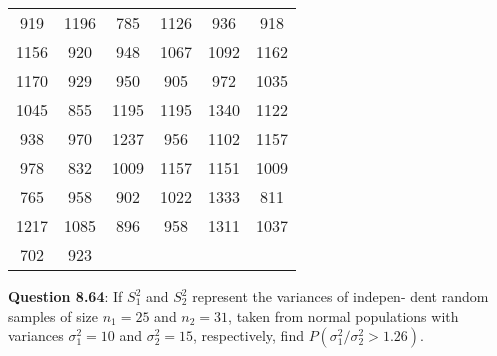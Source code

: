 \documentclass{article}
\begin{document}
        \begin{center}
            \begin{tabular}{c c c c c c}
                919 & 1196 & 785 & 1126 & 936 & 918 \\
                1156 & 920 & 948 & 1067 & 1092 & 1162 \\
                1170 & 929 & 950 & 905 & 972 & 1035 \\
                1045 & 855 & 1195 & 1195 & 1340 & 1122 \\
                938 & 970 & 1237 & 956  & 1102 & 1157 \\
                978 & 832 & 1009 & 1157 & 1151 & 1009 \\
                765 & 958 & 902 & 1022 & 1333 & 811 \\ 
                1217 & 1085 & 896 & 958 & 1311 & 1037 \\
                702 & 923
            \end{tabular}
        \end{center}
    \textbf{Question 8.64}: If $S^2_1$ and $S_2^2$ represent the variances of indepen-
    dent random samples of size $n_1 = 25$ and $n_2 = 31$,
    taken from normal populations with variances $\sigma^2_1 = 10$
    and $\sigma_2^2 = 15$, respectively, find $P(\sigma^2_1 / \sigma_2^2 > 1.26)$.
\end{document}
